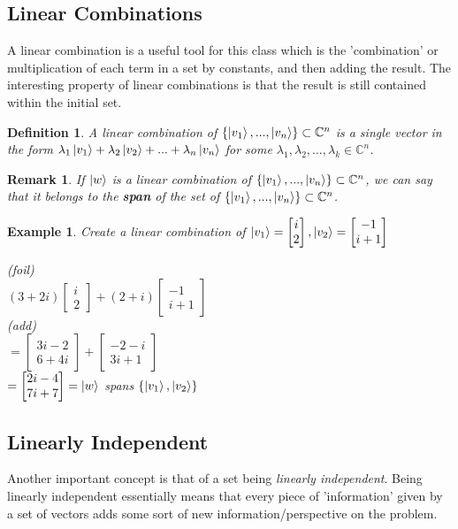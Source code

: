 \documentclass[12pt]{article}
\theoremstyle{plain}
\theoremstyle{nonumberplain}
\theoremstyle{plain}
\newtheorem{definition}[lemma]{Definition}
\newtheorem{example}[lemma]{Example}
\newtheorem{remark}[lemma]{Remark}
\theoremstyle{nonumberplain}
\newcommand\1{{\bf 1}}
\newcommand{\bmat}[1]{\begin{bmatrix*} #1 \end{bmatrix*}} %
\newcommand{\C}{\mathbb{C}} %
\newcommand{\<}{\left\langle}
\renewcommand{\>}{\right\rangle}
\begin{document}
\subsection{Linear Combinations}
A linear combination is a useful tool for this class which is the 'combination' or multiplication of each term in a set by constants, and then adding the result. The interesting property of linear combinations is that the result is still contained within the initial set.

\begin{definition}\label{def:li}
A linear combination of $\lbrace\ket{v_1}, ..., \ket{v_n}\rbrace\subset\C^n$ is a single vector in the form $\lambda_1\ket{v_1} + \lambda_2\ket{v_2} + ... + \lambda_n\ket{v_n}$ for some $\lambda_1, \lambda_2, ... , \lambda_k\in\C^n$.
\end{definition}

\begin{remark}
If $\ket{w}$ is a linear combination of $\lbrace\ket{v_1}, ..., \ket{v_n}\rbrace\subset\C^n$, we can say that it belongs to the \textbf{span} of the set of $\lbrace\ket{v_1}, ..., \ket{v_n}\rbrace\subset\C^n$.
\end{remark}

\begin{example}
Create a linear combination of $\ket{v_1}=\bmat{i \\ 2}, \ket{v_2}=\bmat{-1 \\ i+1}$
\begin{center}
(\textit{foil}) \\
$(3+2i)\bmat{i \\ 2} + (2+i)\bmat{-1 \\ i+1}$ \\
(\textit{add}) \\
$=\bmat{3i-2 \\ 6+4i} + \bmat{-2-i \\ 3i+1}$ \\
$=\bmat{2i-4 \\ 7i+7}=\ket{w}$ \textit{spans} $\lbrace\ket{v_1}, \ket{v_2}\rbrace$
\end{center}
\end{example}


\subsection{Linearly Independent}
Another important concept is that of a set being \textit{linearly independent}. Being linearly independent essentially means that every piece of 'information' given by a set of vectors adds some sort of new information/perspective on the problem.
\end{document}
